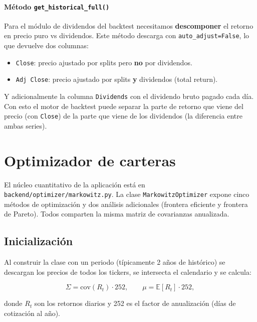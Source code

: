 \documentclass[11pt,a4paper]{article}
\begin{document}
\paragraph{Método \texttt{get\_historical\_full()}}
Para el módulo de dividendos del backtest necesitamos \textbf{descomponer} el retorno en precio puro vs dividendos. Este método descarga con \texttt{auto\_adjust=False}, lo que devuelve dos columnas:
\begin{itemize}
  \item \texttt{Close}: precio ajustado por splits pero \textbf{no} por dividendos.
  \item \texttt{Adj Close}: precio ajustado por splits \textbf{y} dividendos (total return).
\end{itemize}
Y adicionalmente la columna \texttt{Dividends} con el dividendo bruto pagado cada día. Con esto el motor de backtest puede separar la parte de retorno que viene del precio (con \texttt{Close}) de la parte que viene de los dividendos (la diferencia entre ambas series).

\section{Optimizador de carteras}

El núcleo cuantitativo de la aplicación está en \texttt{backend/optimizer/markowitz.py}. La clase \texttt{MarkowitzOptimizer} expone cinco métodos de optimización y dos análisis adicionales (frontera eficiente y frontera de Pareto). Todos comparten la misma matriz de covarianzas anualizada.

\subsection{Inicialización}

Al construir la clase con un periodo (típicamente 2 años de histórico) se descargan los precios de todos los tickers, se intersecta el calendario y se calcula:

\begin{equation}
\Sigma = \mathrm{cov}(R_t)\cdot 252,\qquad \mu = \mathbb{E}[R_t]\cdot 252,
\end{equation}

donde $R_t$ son los retornos diarios y 252 es el factor de anualización (días de cotización al año).
\end{document}
